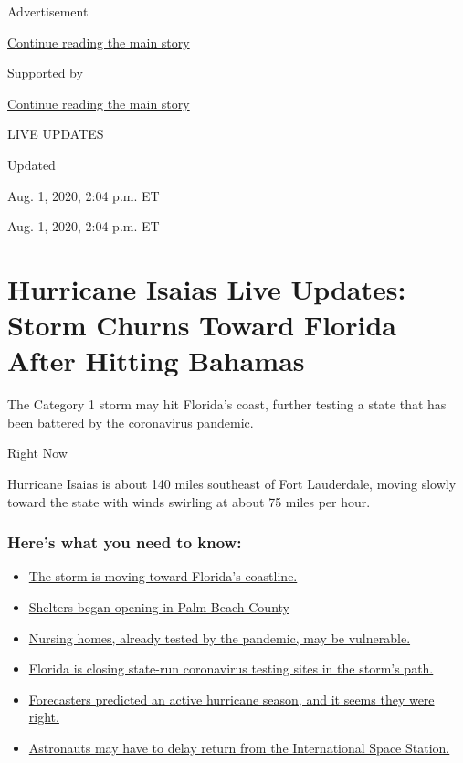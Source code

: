 Advertisement

\protect\hyperlink{after-top}{Continue reading the main story}

Supported by

\protect\hyperlink{after-sponsor}{Continue reading the main story}

LIVE UPDATES

Updated~

Aug. 1, 2020, 2:04 p.m. ET

Aug. 1, 2020, 2:04 p.m. ET

\hypertarget{hurricane-isaias-live-updates-storm-churns-toward-florida-after-hitting-bahamas}{%
\section{Hurricane Isaias Live Updates: Storm Churns Toward Florida
After Hitting
Bahamas}\label{hurricane-isaias-live-updates-storm-churns-toward-florida-after-hitting-bahamas}}

The Category 1 storm may hit Florida's coast, further testing a state
that has been battered by the coronavirus pandemic.

Right Now

Hurricane Isaias is about 140 miles southeast of Fort Lauderdale, moving
slowly toward the state with winds swirling at about 75 miles per hour.

\hypertarget{heres-what-you-need-to-know}{%
\subsubsection{Here's what you need to
know:}\label{heres-what-you-need-to-know}}

\begin{itemize}
\tightlist
\item
  \protect\hyperlink{link-1cd8e207}{The storm is moving toward Florida's
  coastline.}
\item
  \protect\hyperlink{link-45d987d2}{Shelters began opening in Palm Beach
  County}
\item
  \protect\hyperlink{link-1257f12e}{Nursing homes, already tested by the
  pandemic, may be vulnerable.}
\item
  \protect\hyperlink{link-65b0758c}{Florida is closing state-run
  coronavirus testing sites in the storm's path.}
\item
  \protect\hyperlink{link-41916cd2}{Forecasters predicted an active
  hurricane season, and it seems they were right.}
\item
  \protect\hyperlink{link-4b87d643}{Astronauts may have to delay return
  from the International Space Station.}
\end{itemize}

